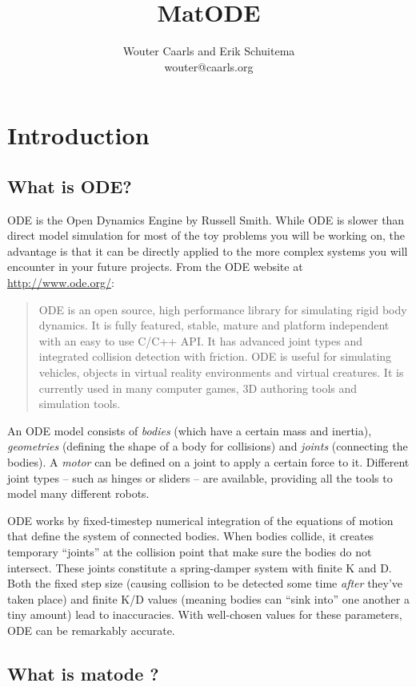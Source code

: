 \documentclass{article}
\title{MatODE}
\author{Wouter Caarls and Erik Schuitema\\
wouter@caarls.org}
\begin{document}
\maketitle
\tableofcontents
\section{Introduction}
\subsection{What is ODE?}

ODE is the Open Dynamics Engine by Russell Smith. While ODE is slower than direct model simulation for most of the toy problems you will be working on, the advantage is that it can be directly applied to the more complex systems you will encounter in your future projects. From the ODE website at \url{http://www.ode.org/}:
\begin{quote}
ODE is an open source, high performance library for simulating rigid body dynamics. It is fully featured, stable, mature and platform independent with an easy to use C/C++ API. It has advanced joint types and integrated collision detection with friction. ODE is useful for simulating vehicles, objects in virtual reality environments and virtual creatures. It is currently used in many computer games, 3D authoring tools and simulation tools.
\end{quote}

An ODE model consists of \emph{bodies} (which have a certain mass and inertia), \emph{geometries} (defining the shape of a body for collisions) and \emph{joints} (connecting the bodies). A \emph{motor} can be defined on a joint to apply a certain force to it. Different joint types -- such as hinges or sliders -- are available, providing all the tools to model many different robots.

ODE works by fixed-timestep numerical integration of the equations of motion that define the system of connected bodies. When bodies collide, it creates temporary ``joints'' at the collision point that make sure the bodies do not intersect. These joints constitute a spring-damper system with finite K and D. Both the fixed step size (causing collision to be detected some time \emph{after} they've taken place) and finite K/D values (meaning bodies can ``sink into'' one another a tiny amount) lead to inaccuracies. With well-chosen values for these parameters, ODE can be remarkably accurate.

\subsection{What is matode ?}
\end{document}
